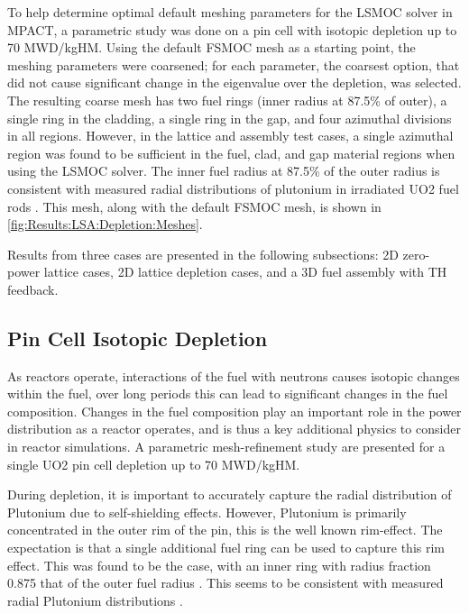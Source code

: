 {{        To help determine optimal default meshing parameters for the \ac{LSMOC} solver in MPACT, a parametric study was done on a pin cell with isotopic depletion up to 70 MWD/kgHM.
        Using the default \ac{FSMOC} mesh as a starting point, the meshing parameters were coarsened; for each parameter, the coarsest option, that did not cause significant change in the eigenvalue over the depletion, was selected.
        The resulting coarse mesh has two fuel rings (inner radius at 87.5\% of outer), a single ring in the cladding, a single ring in the gap, and four azimuthal divisions in all regions.
        However, in the lattice and assembly test cases, a single azimuthal region was found to be sufficient in the fuel, clad, and gap material regions when using the \ac{LSMOC} solver.
        The inner fuel radius at 87.5\% of the outer radius is consistent with measured radial distributions of plutonium in irradiated \acs{UO2} fuel rods \cite{Lassmann1994}.
        This mesh, along with the default \ac{FSMOC} mesh, is shown in \cref{fig:Results:LSA:Depletion:Meshes}.

        Results from three cases are presented in the following subsections: 2D zero-power lattice cases, 2D lattice depletion cases, and a 3D fuel assembly with \ac{TH} feedback.

        \subsection{Pin Cell Isotopic Depletion}{\label{ssec:Results:LSA:Pin Cell}
            As reactors operate, interactions of the fuel with neutrons causes isotopic changes within the fuel, over long periods this can lead to significant changes in the fuel composition.
            Changes in the fuel composition play an important role in the power distribution as a reactor operates, and is thus a key additional physics to consider in reactor simulations.
            A parametric mesh-refinement study are presented for a single \acs{UO2} pin cell depletion up to 70 MWD/kgHM.

            During depletion, it is important to accurately capture the radial distribution of Plutonium due to self-shielding effects.
            However, Plutonium is primarily concentrated in the outer rim of the pin, this is the well known rim-effect.
            The expectation is that a single additional fuel ring can be used to capture this rim effect.
            This was found to be the case, with an inner ring with radius fraction 0.875 that of the outer fuel radius \cite{Fitzgerald2019}.
            This seems to be consistent with measured radial Plutonium distributions \cite{Lassmann1994}.
        }
}}
